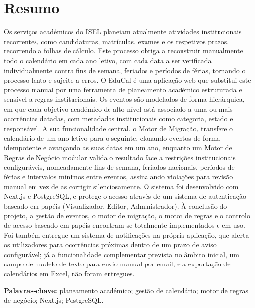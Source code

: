 \documentclass[a4paper,openright,twoside,11pt]{report}
\begin{document}
\chapter*{Resumo}
Os serviços académicos do ISEL planeiam atualmente atividades institucionais recorrentes, como candidaturas, matrículas, exames e os respetivos prazos, recorrendo a folhas de cálculo. Este processo obriga a reconstruir manualmente todo o calendário em cada ano letivo, com cada data a ser verificada individualmente contra fins de semana, feriados e períodos de férias, tornando o processo lento e sujeito a erros. O EduCal é uma aplicação web que substitui este processo manual por uma ferramenta de planeamento académico estruturada e sensível a regras institucionais. Os eventos são modelados de forma hierárquica, em que cada objetivo académico de alto nível está associado a uma ou mais ocorrências datadas, com metadados institucionais como categoria, estado e responsável. A sua funcionalidade central, o Motor de Migração, transfere o calendário de um ano letivo para o seguinte, clonando eventos de forma idempotente e avançando as suas datas em um ano, enquanto um Motor de Regras de Negócio modular valida o resultado face a restrições institucionais configuráveis, nomeadamente fins de semana, feriados nacionais, períodos de férias e intervalos mínimos entre eventos, assinalando violações para revisão manual em vez de as corrigir silenciosamente. O sistema foi desenvolvido com Next.js e PostgreSQL, e protege o acesso através de um sistema de autenticação baseado em papéis (Visualizador, Editor, Administrador). À conclusão do projeto, a gestão de eventos, o motor de migração, o motor de regras e o controlo de acesso baseado em papéis encontram-se totalmente implementados e em uso. Foi também entregue um sistema de notificações na própria aplicação, que alerta os utilizadores para ocorrências próximas dentro de um prazo de aviso configurável; já a funcionalidade complementar prevista no âmbito inicial, um campo de modelo de texto para envio manual por email, e a exportação de calendários em Excel, não foram entregues.

\textbf{Palavras-chave:} planeamento académico; gestão de calendário; motor de regras de negócio; Next.js; PostgreSQL.


\end{document}
